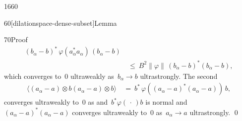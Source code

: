 \begin{parsec}{1660}
\begin{point}{60}[dilationspace-dense-subset]{Lemma}
\begin{point}{70}{Proof}
\begin{align*}
    (b_\alpha - b)^* \,\varphi (a_\alpha^* a_\alpha) \,(b_\alpha - b) \\
    & \ \leq \ 
    B^2 \|\varphi\| \,(b_\alpha - b)^*  (b_\alpha - b),
\end{align*}
which converges to~$0$ ultraweakly as~$b_\alpha \to b$ ultrastrongly.
The second
\begin{align*}
    \langle
        (a_\alpha - a) \otimes b
        (a_\alpha - a) \otimes b \rangle
        & \ = \ 
        b^* \,\varphi((a_\alpha - a)^* (a_\alpha - a)) \, b,
\end{align*}
converges ultraweakly to~$0$
as and~$ b^* \varphi(\,\cdot\,) b$ is normal
and~$(a_\alpha - a)^*(a_\alpha - a)$ converges ultraweakly to~$0$
as~$a_\alpha \to a$ ultrastrongly. \qed
\end{point}
\end{point}
\end{parsec}

